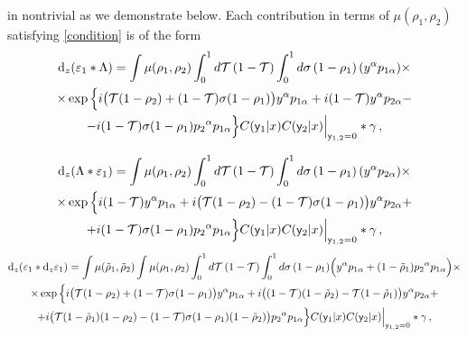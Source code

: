 \documentclass[12pt]{article}
\newcommand{\dr}{{{\rm d}}}
\begin{document}
in nontrivial as we demonstrate below. Each contribution in terms of $\mu(\rho_1,\rho_2)$ satisfying \eqref{condition} is of the form
\begin{multline}\label{e_Lambda}
\dr_z(\varepsilon_1\ast \Lambda)=\int \mu(\rho_1,\rho_2)\int_0^1 d\mathcal{T}\, (1-\mathcal{T})\int_0^1 d\sigma\, (1-\rho_1)\, (y^\alpha p_{1\alpha})\times\\
\times \exp\Big\{i\big(\mathcal{T}(1-\rho_2)+(1-\mathcal{T})\sigma (1-\rho_1)\big)y^\alpha p_{1\alpha}+i(1-\mathcal{T})y^\alpha p_{2\alpha}-\\
-i(1-\mathcal{T})\sigma (1-\rho_1)p_2 {}^\alpha p_{1\alpha}\Big\}C(\mathsf{y}_1|x)C(\mathsf{y}_2|x)\Big|_{\mathsf{y}_{1,2}=0}\ast \gamma\,,
\end{multline}

\begin{multline}\label{Lambda_e}
\dr_z (\Lambda\ast \varepsilon_1)=\int \mu(\rho_1,\rho_2) \int_0^1 d\mathcal{T}\, (1-\mathcal{T})\int_0^1 d\sigma\, (1-\rho_1)\, (y^\alpha p_{2\alpha})\times\\
\times \exp\Big\{i(1-\mathcal{T})y^\alpha p_{1\alpha}+i\big(\mathcal{T}(1-\rho_2)-(1-\mathcal{T})\sigma (1-\rho_1)\big)y^\alpha p_{2\alpha}+\\+i(1-\mathcal{T})\sigma(1-\rho_1)p_2 {}^\alpha p_{1\alpha}\Big\}C(\mathsf{y}_1|x)C(\mathsf{y}_2|x)\Big|_{\mathsf{y}_{1,2}=0}\ast \gamma\,,
\end{multline}
\begin{multline}\label{e_de}
\dr_z(\varepsilon_1\ast \dr_z \varepsilon_1)=\int \mu(\tilde{\rho}_1,\tilde{\rho}_2)\int \mu(\rho_1,\rho_2)\int_0^1 d\mathcal{T}\, (1-\mathcal{T}) \int_0^1 d\sigma\, (1-\rho_1)\Big(y^\alpha p_{1\alpha}+(1-\tilde{\rho}_1)p_2 {}^\alpha p_{1\alpha}\Big)\times\\
\times\exp\Big\{i\big(\mathcal{T}(1-\rho_2)+(1-\mathcal{T})\sigma(1-\rho_1)\big)y^\alpha p_{1\alpha}+i\big((1-\mathcal{T})(1-\tilde{\rho}_2)-\mathcal{T}(1-\tilde{\rho}_1)\big)y^\alpha p_{2\alpha}+\\
+i\big(\mathcal{T}(1-\tilde{\rho}_1)(1-\rho_2)-(1-\mathcal{T})\sigma(1-\rho_1)(1-\tilde{\rho}_2)\big)p_2 {}^\alpha p_{1\alpha}\Big\}C(\mathsf{y}_1|x)C(\mathsf{y}_2|x)\Big|_{\mathsf{y}_{1,2}=0}\ast \gamma\,,
\end{multline}
\end{document}
